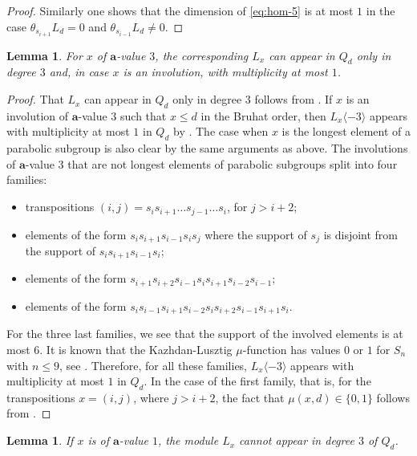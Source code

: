 \documentclass[a4paper]{amsart}
\newtheorem{lemma}[theorem]{Lemma}
\begin{document}
\begin{proof}
Similarly one shows that 
the dimension of \eqref{eq:hom-5} is at most $1$ 
in the case $\theta_{s_{i+1}}L_d=0$
and $\theta_{s_{i-1}}L_d\neq 0$.
\end{proof}

\begin{lemma}\label{lem12357-2}
For  $x$ of $\mathbf{a}$-value $3$, the corresponding $L_x$
can appear in $Q_d$ only in degree $3$ and, in case $x$ is an involution,
with multiplicity at most $1$.
\end{lemma}

\begin{proof}
That $L_x$ can appear in $Q_d$ only in degree $3$
follows from \cite[Theorem~2.2]{KMM}.
If $x$ is an involution of $\mathbf{a}$-value $3$ such that 
$x\leq d$ in the Bruhat order, then $L_x\langle -3\rangle$
appears with multiplicity at most $1$ in $Q_d$ by 
\cite[Theorem~1.4]{Xi}. The case when $x$ is the longest element
of a parabolic subgroup is also clear by the same arguments 
as above. The involutions of $\mathbf{a}$-value $3$ that are
not longest elements of parabolic subgroups split into four
families:
\begin{itemize}
\item transpositions $(i,j)=s_is_{i+1}\dots s_{j-1}\dots s_i$, for $j>i+2$;
\item elements of the form  $s_is_{i+1}s_{i-1}s_is_j$
where the support of $s_j$ is disjoint from the 
support of $s_is_{i+1}s_{i-1}s_i$;
\item elements of the form $s_{i+1}s_{i+2}s_{i-1}s_{i}s_{i+1}s_{i-2}s_{i-1}$;
\item elements of the form $s_{i}s_{i-1}s_{i+1}s_{i-2}s_{i}s_{i+2}s_{i-1}s_{i+1}s_{i}$.
\end{itemize}
For the three last families, we see that the support of the involved elements
is at most $6$. It is known that the Kazhdan-Lusztig $\mu$-function 
has values $0$ or $1$ for $S_n$ with $n\leq 9$, see \cite{MW}.
Therefore, for all these families, $L_x\langle -3\rangle$
appears with multiplicity at most $1$ in $Q_d$.
In the case of the first family, that is, for the transpositions $x=(i,j)$,
where $j>i+2$, the fact that $\mu(x,d)\in\{0,1\}$ follows from \cite[Theorem~2]{SSV}.
\end{proof}


\begin{lemma}\label{lem12357-3}
If $x$ is of $\mathbf{a}$-value $1$, the module $L_x$ 
cannot appear in degree $3$ of $Q_d$.  
\end{lemma}
\end{document}
